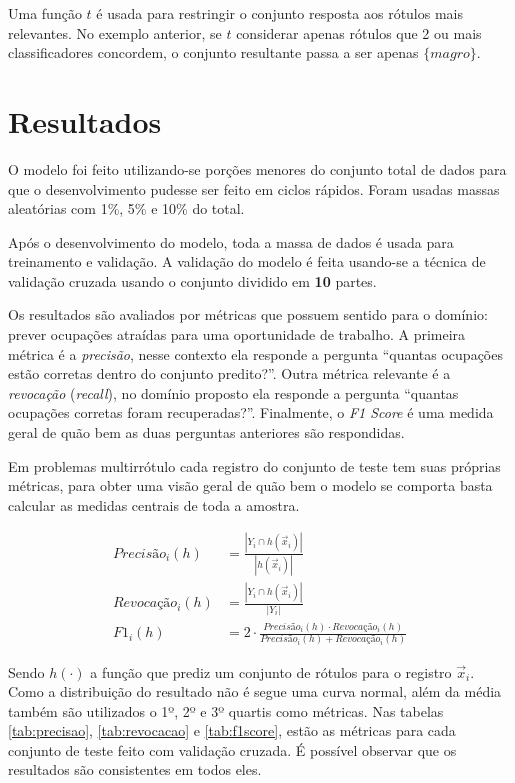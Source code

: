 \documentclass[runningheads,a4paper]{llncs}
\begin{document}
Uma função $t$ é usada para restringir o conjunto resposta aos rótulos mais relevantes. No exemplo anterior, se $t$ considerar apenas rótulos que 2 ou mais classificadores concordem, o conjunto resultante passa a ser apenas $\{magro\}$.

\section{Resultados} \label{sec:resultados}

O modelo foi feito utilizando-se porções menores do conjunto total de dados para que o desenvolvimento pudesse ser feito em ciclos rápidos. Foram usadas massas aleatórias com 1\%, 5\% e 10\% do total.

Após o desenvolvimento do modelo, toda a massa de dados é usada para treinamento e validação. A validação do modelo é feita usando-se a técnica de validação cruzada \cite{Kohavi95-as} usando o conjunto dividido em \textbf{10} partes.

Os resultados são avaliados por métricas que possuem sentido para o domínio: prever ocupações atraídas para uma oportunidade de trabalho. A primeira métrica é a \textit{precisão}, nesse contexto ela responde a pergunta \enquote{quantas ocupações estão corretas dentro do conjunto predito?}. Outra métrica relevante é a \textit{revocação} (\textit{recall}), no domínio proposto ela responde a pergunta \enquote{quantas ocupações corretas foram recuperadas?}. Finalmente, o \textit{F1 Score} é uma medida geral de quão bem as duas perguntas anteriores são respondidas.

Em problemas multirrótulo cada registro do conjunto de teste tem suas próprias métricas, para obter uma visão geral de quão bem o modelo se comporta basta calcular as medidas centrais de toda a amostra.

\begin{align*}
Precisão_i(h) &= \frac{|Y_i \cap h(\vec{x}_i)|}{|h(\vec{x}_i)|} \\
Revocação_i(h) &= \frac{|Y_i \cap h(\vec{x}_i)|}{|Y_i|} \\
F1_i(h) &= 2 \cdot \frac{Precisão_i(h) \cdot Revocação_i(h)}{Precisão_i(h) + Revocação_i(h)} 
\end{align*}

Sendo $h(\cdot)$ a função que prediz um conjunto de rótulos para o registro $\vec{x}_i$. Como a distribuição do resultado não é segue uma curva normal, além da média também são utilizados o 1º, 2º e 3º quartis como métricas. Nas tabelas \ref{tab:precisao}, \ref{tab:revocacao} e \ref{tab:f1score}, estão as métricas para cada conjunto de teste feito com validação cruzada. É possível observar que os resultados são consistentes em todos eles.
\end{document}
